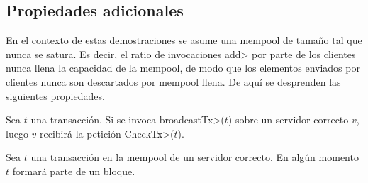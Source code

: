 \subsection{Propiedades adicionales}
En el contexto de estas demostraciones
se asume una mempool de tamaño tal que nunca se satura.
Es decir, el ratio de invocaciones \<add> por parte de los clientes nunca
llena la capacidad de la mempool, de modo que los elementos enviados por clientes
nunca son descartados por mempool llena.
De aquí se desprenden las siguientes propiedades.

\begin{property}\label{tendermint:eventual-checktx}
  Sea $t$ una transacción.
  Si se invoca \<broadcastTx>($t$) sobre un servidor correcto $v$, luego
  $v$ recibirá la petición \<CheckTx>($t$).
\end{property}

\begin{property}\label{tendermint:eventual-injection}
  Sea $t$ una transacción en la mempool de un servidor correcto.
  En algún momento $t$ formará parte de un bloque.
\end{property}




